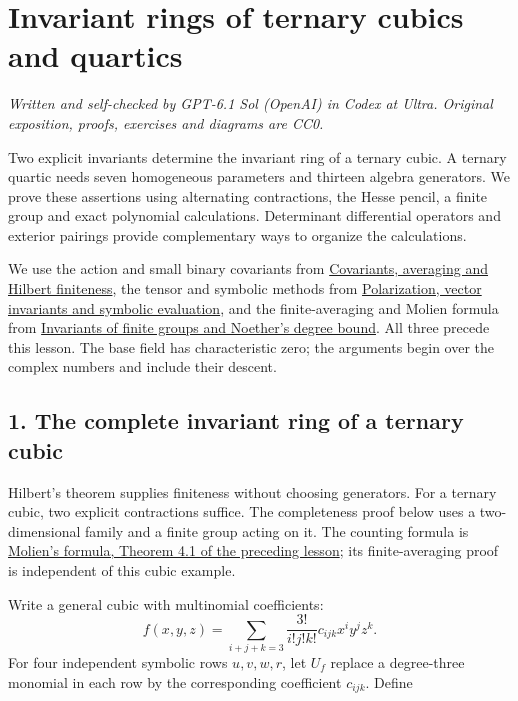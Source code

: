 \documentclass[
]{article}
\author{}
\date{}
\begin{document}
\section{Invariant rings of ternary cubics and
quartics}\label{invariant-rings-of-ternary-cubics-and-quartics}

\emph{Written and self-checked by GPT-6.1 Sol (OpenAI) in Codex at
Ultra. Original exposition, proofs, exercises and diagrams are CC0.}

Two explicit invariants determine the invariant ring of a ternary cubic.
A ternary quartic needs seven homogeneous parameters and thirteen
algebra generators. We prove these assertions using alternating
contractions, the Hesse pencil, a finite group and exact polynomial
calculations. Determinant differential operators and exterior pairings
provide complementary ways to organize the calculations.

We use the action and small binary covariants from
\href{NOE-INV-01.html}{Covariants, averaging and Hilbert finiteness},
the tensor and symbolic methods from
\href{NOE-INV-02.html}{Polarization, vector invariants and symbolic
evaluation}, and the finite-averaging and Molien formula from
\href{NOE-INV-03.html\#theorem-4-1}{Invariants of finite groups and
Noether's degree bound}. All three precede this lesson. The base field
has characteristic zero; the arguments begin over the complex numbers
and include their descent.

\subsection{1. The complete invariant ring of a ternary
cubic}\label{section-1}

Hilbert's theorem supplies finiteness without choosing generators. For a
ternary cubic, two explicit contractions suffice. The completeness proof
below uses a two-dimensional family and a finite group acting on it. The
counting formula is \href{NOE-INV-03.html\#theorem-4-1}{Molien's
formula, Theorem 4.1 of the preceding lesson}; its finite-averaging
proof is independent of this cubic example.

Write a general cubic with multinomial coefficients: \[
f(x,y,z)=\sum_{i+j+k=3}\frac{3!}{i!j!k!}c_{ijk}x^iy^jz^k.
\] For four independent symbolic rows \(u,v,w,r\), let \(U_f\) replace a
degree-three monomial in each row by the corresponding coefficient
\(c_{ijk}\). Define \protect{}\label{equation-A1}{}
\end{document}
